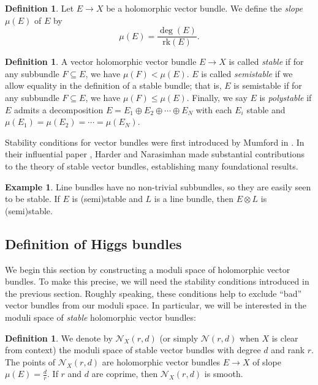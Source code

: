 \documentclass[10pt]{amsart}
\numberwithin{equation}{section}
\def\~#1{\mathscr{#1}}
\newcommand{\rk}{\mathrm{rk}}
\theoremstyle{plain}
\theoremstyle{definition}
\newtheorem{defn}[thm]{Definition}
\newtheorem{ex}[thm]{Example}
\theoremstyle{remark}
\begin{document}
\begin{defn}
    Let $E \to X$ be a holomorphic vector bundle. We define the \emph{slope} $\mu(E)$ of $E$ by
    \[\mu(E) = \frac{\deg(E)}{\rk(E)}.\]
\end{defn}   

\begin{defn}
    A vector holomorphic vector bundle $E \to X$ is called \emph{stable} if for any subbundle $F \subseteq E$, we have $\mu(F) < \mu(E)$. $E$ is called \emph{semistable} if we allow equality in the definition of a stable bundle; that is, $E$ is semistable if for any subbundle $F \subseteq E$, we have $\mu(F) \le \mu(E)$. Finally, we say $E$ is \emph{polystable} if $E$ admits a decomposition $E = E_1 \oplus E_2 \oplus \cdots \oplus E_N$ with each $E_i$ stable and $\mu(E_1) = \mu(E_2) = \cdots = \mu(E_N)$.
\end{defn}

Stability conditions for vector bundles were first introduced by Mumford in \cite{mumford62}. In their influential paper \cite{HN}, Harder and Narasimhan made substantial contributions to the theory of stable vector bundles, establishing many foundational results.

\begin{ex}
    Line bundles have no non-trivial subbundles, so they are easily seen to be stable. If $E$ is (semi)stable and $L$ is a line bundle, then $E \otimes L$ is (semi)stable.
\end{ex}

\subsection{Definition of Higgs bundles} We begin this section by constructing a moduli space of holomorphic vector bundles. To make this precise, we will need the stability conditions introduced in the previous section. Roughly speaking, these conditions help to exclude ``bad'' vector bundles from our moduli space. In particular, we will be interested in the moduli space of \emph{stable} holomorphic vector bundles:
\begin{defn}
    We denote by $\~N_X(r,d)$ (or simply $\~N(r, d)$ when $X$ is clear from context) the moduli space of stable vector bundles with degree $d$ and rank $r$. The points of $\~N_X(r,d)$ are holomorphic vector bundles $E \to X$ of slope $\mu(E) = \frac{d}{r}$. If $r$ and $d$ are coprime, then $\~N_X (r, d)$ is smooth.
\end{defn}
\end{document}
